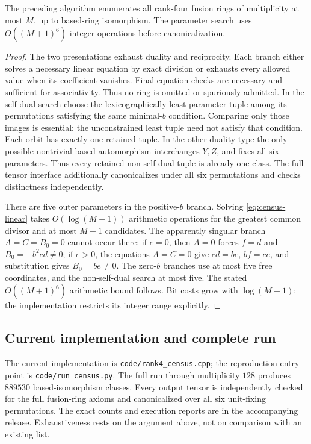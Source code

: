 \begin{proposition}\label{prop:census}
The preceding algorithm enumerates all rank-four fusion rings of
multiplicity at most $M$, up to based-ring isomorphism. The parameter
search uses $O((M+1)^6)$ integer operations before canonicalization.
\end{proposition}
\begin{proof}
The two presentations exhaust duality and reciprocity. Each branch either
solves a necessary linear equation by exact division or exhausts every
allowed value when its coefficient vanishes. Final equation checks are
necessary and sufficient for associativity. Thus no ring is omitted or
spuriously admitted. In the self-dual search choose the lexicographically
least parameter tuple among its permutations satisfying the same
minimal-$b$ condition. Comparing only those images is essential: the
unconstrained least tuple need not satisfy that condition. Each orbit has
exactly one retained tuple. In the other duality type the only possible
nontrivial based automorphism interchanges $Y,Z$, and fixes all six
parameters. Thus every retained non-self-dual tuple is already one class.
The full-tensor interface additionally canonicalizes under all six
permutations and checks distinctness independently.

There are five outer parameters in the positive-$b$ branch. Solving
\eqref{eq:census-linear} takes $O(\log(M+1))$ arithmetic operations for
the greatest common divisor and at most $M+1$ candidates. The apparently
singular branch $A=C=B_0=0$ cannot occur there: if $e=0$, then
$A=0$ forces $f=d$ and $B_0=-b^2cd\ne0$; if $e>0$, the equations
$A=C=0$ give $cd=be$, $bf=ce$, and substitution gives $B_0=be\ne0$.
The zero-$b$ branches use at most five free coordinates, and the
non-self-dual search at most five. The stated $O((M+1)^6)$ arithmetic
bound follows. Bit costs grow with $\log(M+1)$; the implementation
restricts its integer range explicitly.
\end{proof}

\subsection{Current implementation and complete run}
The current implementation is \texttt{code/rank4\_census.cpp}; the
reproduction entry point is \texttt{code/run\_census.py}. The full
run through multiplicity $128$ produces $889530$ based-isomorphism
classes. Every output tensor is independently checked for the full
fusion-ring axioms and canonicalized over all six unit-fixing
permutations. The exact counts and execution reports are in the
accompanying release. Exhaustiveness rests on the argument above,
not on comparison with an existing list.
